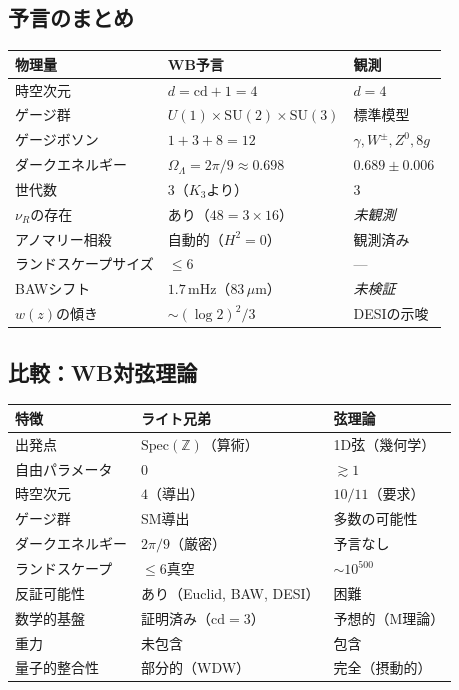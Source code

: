 \documentclass[12pt,a4paper]{article}
\theoremstyle{definition}
\newcommand{\Spec}{\mathrm{Spec}}
\newcommand{\cd}{\mathrm{cd}}
\newcommand{\SU}{\mathrm{SU}}
\newcommand{\Z}{\mathbb{Z}}
\newcommand{\OmL}{\Omega_\Lambda}
\begin{document}
\subsection{予言のまとめ}

\begin{center}
\begin{longtable}{p{3.5cm}p{4cm}p{4cm}}
\toprule
\textbf{物理量} & \textbf{WB予言} & \textbf{観測} \\
\midrule
\endhead
時空次元 & $d=\cd+1=4$ & $d=4$ \\
ゲージ群 & $U(1)\times\SU(2)\times\SU(3)$ & 標準模型 \\
ゲージボソン & $1+3+8=12$ & $\gamma,W^\pm,Z^0,8g$ \\
ダークエネルギー & $\OmL=2\pi/9\approx 0.698$ & $0.689\pm 0.006$ \\
世代数 & $3$（$K_3$より） & $3$ \\
$\nu_R$の存在 & あり（$48=3\times 16$） & \textit{未観測} \\
アノマリー相殺 & 自動的（$H^2=0$） & 観測済み \\
ランドスケープサイズ & $\le 6$ & --- \\
BAWシフト & $1.7\,$mHz（$83\,\mu$m） & \textit{未検証} \\
$w(z)$の傾き & $\sim(\log 2)^2/3$ & DESIの示唆 \\
\bottomrule
\end{longtable}
\end{center}

\subsection{比較：WB対弦理論}

\begin{center}
\begin{tabular}{p{3cm}p{4.5cm}p{4.5cm}}
\toprule
\textbf{特徴} & \textbf{ライト兄弟} & \textbf{弦理論} \\
\midrule
出発点         & $\Spec(\Z)$（算術）         & 1D弦（幾何学） \\
自由パラメータ & $0$                          & $\gtrsim 1$ \\
時空次元       & $4$（導出）                  & $10/11$（要求） \\
ゲージ群       & SM導出                       & 多数の可能性 \\
ダークエネルギー & $2\pi/9$（厳密）           & 予言なし \\
ランドスケープ & $\le 6$真空                  & $\sim 10^{500}$ \\
反証可能性     & あり（Euclid, BAW, DESI）    & 困難 \\
数学的基盤     & 証明済み（$\cd=3$）          & 予想的（M理論） \\
重力           & 未包含                        & 包含 \\
量子的整合性   & 部分的（WDW）                & 完全（摂動的） \\
\bottomrule
\end{tabular}
\end{center}
\end{document}
